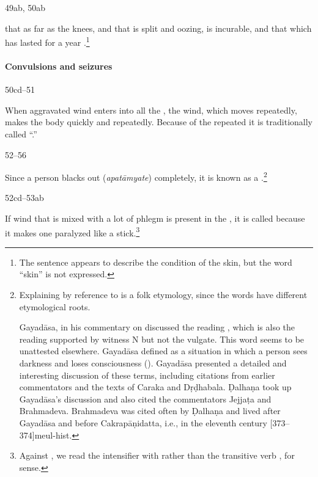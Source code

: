 \begin{translation}
\item[49ab, 50ab]

 that  as far as
the knees, and that is split and oozing, is incurable, and that which
has lasted for a year .\footnote{The
    sentence appears to describe the condition of the skin, but the word
    “skin” is not expressed.}
  
\paragraph{Convulsions and seizures}

\item[50cd--51]

When aggravated wind enters into all the , the
wind, which moves repeatedly, makes the body 
quickly and repeatedly. Because of the repeated
 it is traditionally called “.”


\item[52--56]

	Since a person blacks out (\emph{apatāmyate}) completely, it is
known as a .\footnote{Explaining  by 
reference to
     is a folk etymology, since the words have different
    etymological roots. 
    
    Gayadāsa, in his commentary on  discussed the
reading , which is also the  reading supported by
witness N but not the vulgate.  This word seems to be unattested
elsewhere.  Gayadāsa defined  as a situation in which
a person sees darkness and loses consciousness (). Gayadāsa presented a detailed and interesting
discussion of these terms, including citations from earlier
commentators and the texts of Caraka and Dṛḍhabala. Ḍalhaṇa took
up Gayadāsa's discussion and also cited the commentators Jejjaṭa
and Brahmadeva. Brahmadeva was cited often by Ḍalhaṇa and lived
after Gayadāsa and before Cakrapāṇidatta, i.e., in the eleventh
century [373--374]{meul-hist}.\label{Brahmadeva}}

\item[52cd--53ab] 

If wind that is mixed with a lot of phlegm is present in
the , it is called  because it makes one paralyzed like a stick.\footnote{Against
    , we read the intensifier  with 
     rather
    than the transitive verb , for sense.
    
}
\end{translation}
